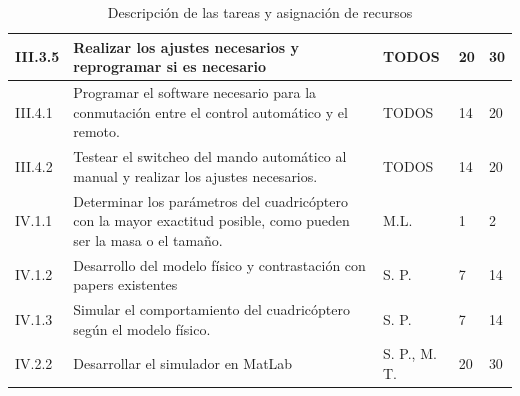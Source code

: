 \documentclass[spanish,12pt,a4paper,titlepage]{report}
\begin{document}
\begin{table}[H]
\begin{tabular}{|p{50pt}|p{220pt}|p{60pt}|p{20pt}|p{20pt}|} 
\hline
III.3.5  & Realizar los ajustes necesarios y reprogramar si es necesario & TODOS  & 20 & 30\\ \hline
III.4.1  & Programar el software necesario para la conmutación entre el control automático y el remoto. & TODOS  & 14 & 20 \\ \hline
III.4.2  & Testear el switcheo del mando automático al manual y realizar los ajustes necesarios. & TODOS & 14 & 20 \\ \hline \hline
IV.1.1  &  Determinar los parámetros del cuadricóptero con la mayor exactitud posible, como pueden ser la masa o el tamaño.  &  M.L. & 1 & 2\\ \hline
IV.1.2  & Desarrollo del modelo físico y contrastación con papers existentes & S. P. & 7 & 14 \\ \hline
IV.1.3  &  Simular el comportamiento del cuadricóptero según el modelo físico. & S. P.  & 7 & 14  \\ \hline
IV.2.2  &  Desarrollar el simulador en MatLab & S. P., M. T.  & 20 & 30 \\ \hline
\end{tabular} 
\caption{Descripción de las tareas y asignación de recursos}
\label{tab:tareas_y_recursos}
\end{table}
\end{document}
